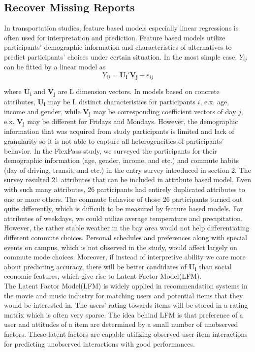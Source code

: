 \documentclass[preprint,12pt]{elsarticle}
\begin{document}
\subsection{Recover Missing Reports} 
In transportation studies, feature based models especially linear regressions is often used for interpretation and prediction. Feature based models utilize participants' demographic information and characteristics of alternatives to predict participants' choices under certain situation. In the most simple case, $Y_{ij}$ can be fitted by a linear model as
\begin{equation}\label{eq:Y_UV}
{Y_{ij}} = {\mathbf{U_i}}'{\mathbf{V_j}} + {\varepsilon _{ij}}
\end{equation}

where $\mathbf{U_i}$ and $\mathbf{V_j}$ are L dimension vectors. In models based on concrete attributes, $\mathbf{U_i}$ may be L distinct characteristics for participants $i$, e.x. age, income and gender, while $\mathbf{V_j}$ may be corresponding coefficient vectors of day $j$, e.x. $\mathbf{V_j}$ may be different for Fridays and Mondays. However, the demographic information that was acquired from study participants is limited and lack of granularity so it is not able to capture all heterogeneities of participants' behavior. In the FlexPass study, we surveyed the participants for their demographic information (age, gender, income, and etc.) and commute habits (day of driving, transit, and etc.) in the entry survey introduced in section 2. The survey resulted 21 attributes that can be included in attribute based model. Even with such many attributes, 26 participants had entirely duplicated attributes to one or more others. The commute behavior of those 26 participants turned out quite differently, which is difficult to be measured by feature based models. For attributes of weekdays, we could utilize average temperature and precipitation. However, the rather stable weather in the bay area would not help differentiating different commute choices. Personal schedules and preferences along with special events on campus, which is not observed in the study, would affect largely on commute mode choices. Moreover, if instead of interpretive ability we care more about predicting accuracy, there will be better candidates of $\mathbf{U_i}$ than social economic features, which give rise to Latent Factor Model(LFM).\\     

The Latent Factor Model(LFM) is widely applied in recommendation systems in the movie and music industry for matching users and potential items that they would be interested in. The users' rating towards items will be stored in a rating matrix which is often very sparse. The idea behind LFM is that preference of a user and attitudes of a item are determined by a small number of unobserved factors. These latent factors are capable utilizing observed user-item interactions for predicting unobserved interactions with good performances. \\
\end{document}
